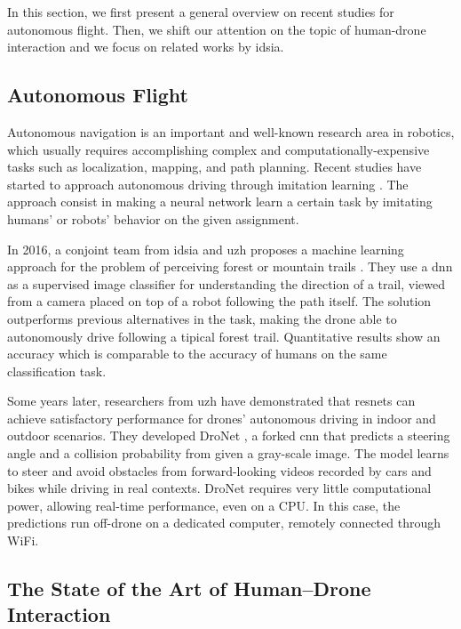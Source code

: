\medskip

In this section, we first present a general overview on recent studies for autonomous flight. Then, we shift our attention on the topic of human-drone interaction and we focus on related works by \gls{idsia}.



\subsection{Autonomous Flight}
\label{subsec:drone-auto-drive}

Autonomous navigation is an important and well-known research area in robotics, which usually requires accomplishing complex and computationally-expensive tasks such as localization, mapping, and path planning. Recent studies have started to approach autonomous driving through imitation learning \cite{imitation_learning_survey}. The approach consist in making a neural network learn a certain task by imitating humans' or robots' behavior on the given assignment.

\medskip

In 2016, a conjoint team from \gls{idsia} and \gls{uzh} proposes a machine learning approach for the problem of perceiving forest or mountain trails \cite{giusti2016machine}. They use a \gls{dnn} as a supervised image classifier for understanding the direction of a trail, viewed from a camera placed on top of a robot following the path itself. The solution outperforms previous alternatives in the task, making the drone able to autonomously drive following a tipical forest trail. Quantitative results show an accuracy which is comparable to the accuracy of humans on the same classification task.

Some years later, researchers from \gls{uzh} have demonstrated that \gls{resnet}s can achieve satisfactory performance for drones' autonomous driving in indoor and outdoor scenarios. They developed DroNet \cite{Loquercio_2018}, a forked \gls{cnn} that predicts a steering angle and a collision probability from given a gray-scale image. The model learns to steer and avoid obstacles from forward-looking videos recorded by cars and bikes while driving in real contexts. DroNet requires very little computational power, allowing real-time performance, even on a CPU. In this case, the predictions run off-drone on a dedicated computer, remotely connected through WiFi.



\clearpage
\subsection{The State of the Art of Human–Drone Interaction}
\label{subsec:human-drone-sota}

